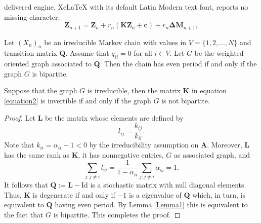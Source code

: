 \documentclass[10pt,a4paper]{amsart}
\newcommand{\Id}{\boldsymbol{\mathrm{Id}}}
\begin{document}
delivered engine, XeLaTeX with its default Latin Modern text font, reports no missing character.
		\begin{equation}\label{equation2}
			\mathbf{Z}_{n+1}=\mathbf{Z}_n+ r_n (\mathbf{K}\mathbf{Z}_n+\mathbf{c})+ r_n \mathbf{\Delta M}_{n+1},
		\end{equation}

		\begin{lemma}\label{Lemma1}
			Let $(X_n)_n$ be an irreducible Markov chain with values in $V=\{1,2,\ldots, N\}$ and  transition matrix $\mathbf{Q}$. Assume that $q_{ii} = 0$ for all $i \in V$. Let $G$ be the weighted oriented graph associated to $\mathbf{Q}$. Then the chain has even period if and only if the graph $G$ is bipartite. 
		\end{lemma}

		\begin{proposition}\label{matrixK}
			Suppose that the graph $G$ is irreducible, then the matrix $\mathbf{K}$ in equation \eqref{equation2} is invertible if and only if the graph $G$ is not bipartite. 
		\end{proposition}

		\begin{proof}
			Let $\mathbf{L}$ be the matrix whose elements are defined by
			\[
			l_{ij} =  \frac{k_{ij}}{k_{ii}}.
			\]
			Note that $k_{ii} = \alpha_{ii} - 1 <0$ by the irreducibility assumption on $\mathbf{A}$. Moreover, $\mathbf{L}$ has the same rank as $\mathbf{K}$, it has nonnegative entries, $G$ as associated graph, and
			\[
			\sum_{j:j \neq i} l_{ij} = \frac{1}{1-\alpha_{ii}} \sum_{j:j \neq i} \alpha_{ij} = 1.
			\]
			It follows that $\mathbf{Q} := \mathbf{L} - \Id$ is a stochastic matrix with null diagonal elements. Thus, $\mathbf{K}$ is degenerate if and only if $-1$ is a eigenvalue of $\mathbf{Q}$ which, in turn, is equivalent to $\mathbf{Q}$ having even period. By Lemma \ref{Lemma1} this is equivalent to the fact that $G$ is bipartite. This completes the proof.
		\end{proof}
\end{document}
